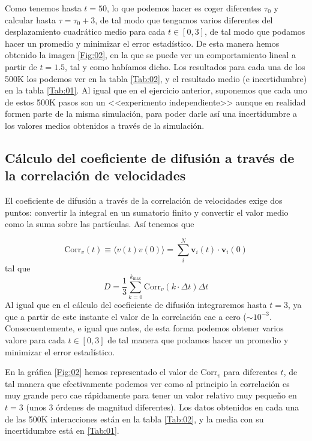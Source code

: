 \documentclass[11pt]{article} %
\newcommand{\vn}{\mathbf{v}}
\begin{document}
Como tenemos hasta $t=50$, lo que podemos hacer es coger diferentes $\tau_0$ y calcular hasta $\tau=\tau_0+3$, de tal modo que tengamos varios diferentes del desplazamiento cuadrático medio para cada $t\in[0,3]$, de tal modo que podamos hacer un promedio y minimizar el error estadístico. De esta manera hemos obtenido la imagen \ref{Fig:02}, en la que se puede ver un comportamiento lineal a partir de $t=1.5$, tal y como habíamos dicho. Los resultados para cada una de los 500K los podemos ver en la tabla \ref{Tab:02}, y el resultado medio (e incertidumbre) en la tabla \ref{Tab:01}. Al igual que en el ejercicio anterior, suponemos que cada uno de estos 500K pasos son un <<experimento independiente>> aunque en realidad formen parte de la misma simulación, para poder darle así una incertidumbre a los valores medios obtenidos a través de la simulación.



\subsection[Coeficiente de difusión a través de $\text{Corr}_v$]{Cálculo del coeficiente de difusión a través de la correlación de velocidades}

El coeficiente de difusión a través de la correlación de velocidades exige dos puntos: convertir la integral en un sumatorio finito y convertir el valor medio como la suma sobre las partículas. Así tenemos que 


\begin{equation}
	\text{Corr}_v(t)\equiv \langle v(t)v(0)\rangle = \sum_{i}^N \vn_i(t) \cdot \vn_i(0)
\end{equation}
tal que 
\begin{equation}
	D = \frac{1}{3} \sum_{k=0}^{k_{\max}}  \text{Corr}_v (k \cdot \Delta t) \Delta t
\end{equation}
Al igual que en el cálculo del coeficiente de difusión integraremos hasta $t=3$, ya que a partir de este instante el valor de la correlación cae a cero ($\sim 10^{-3}$. Consecuentemente, e igual que antes, de esta forma podemos obtener varios valore para cada $t\in[0,3]$ de tal manera que podamos hacer un promedio y minimizar el error estadístico.

En la gráfica \ref{Fig:02} hemos representado el valor de $\text{Corr}_v$ para diferentes $t$, de tal manera que efectivamente podemos ver como al principio la correlación es muy grande pero cae rápidamente para tener un valor relativo muy pequeño en $t=3$ (unos 3 órdenes de magnitud diferentes). Los datos obtenidos en cada una de las 500K interacciones están en la tabla \ref{Tab:02}, y la media con su incertidumbre está en \ref{Tab:01}.
\end{document}
